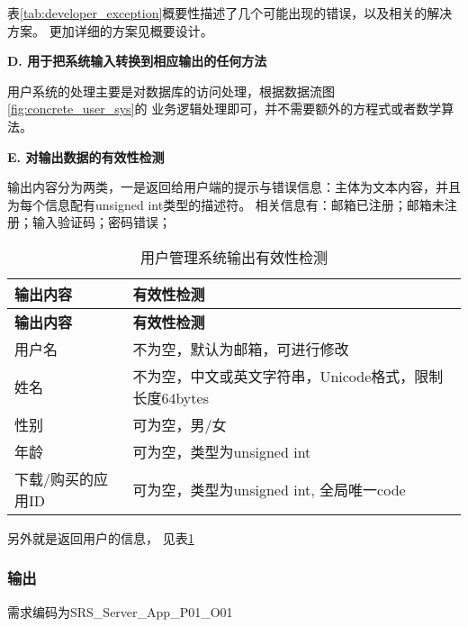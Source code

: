 表\ref{tab:developer_exception}概要性描述了几个可能出现的错误，以及相关的解决方案。
更加详细的方案见概要设计。



\textbf{D. 用于把系统输入转换到相应输出的任何方法}

用户系统的处理主要是对数据库的访问处理，根据数据流图\ref{fig:concrete_user_sys}的
业务逻辑处理即可，并不需要额外的方程式或者数学算法。
		
\textbf{E. 对输出数据的有效性检测}

输出内容分为两类，一是返回给用户端的提示与错误信息：主体为文本内容，并且为每个信息配有unsigned int类型的描述符。
相关信息有：邮箱已注册；邮箱未注册；输入验证码；密码错误；

\begin{longtable}{|p{7cm}|p{7cm}|}
\caption{用户管理系统输出有效性检测}\label{tab:concrete_user_sys_output_valid} \\
\hline
\textbf{输出内容} & \textbf{有效性检测} \\
\hline
\endfirsthead
\hline
\textbf{输出内容} & \textbf{有效性检测} \\
\hline
\endhead
\hline 
\endfoot
\hline
\endlastfoot
用户名 & 不为空，默认为邮箱，可进行修改 \\
姓名 & 不为空，中文或英文字符串，Unicode格式，限制长度64bytes \\
性别 & 可为空，男/女 \\
年龄 & 可为空，类型为unsigned int \\
下载/购买的应用ID & 可为空，类型为unsigned int, 全局唯一code \\
\end{longtable}


另外就是返回用户的信息，
见表\ref{tab:concrete_user_sys_output_valid}

\subsubsection{输出}

需求编码为SRS\_Server\_App\_P01\_O01

